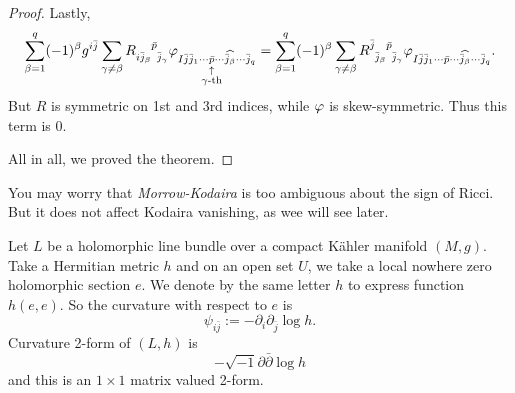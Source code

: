 \documentclass[12pt]{article}
\begin{document}
\begin{proof}
  Lastly, \[
    \sum_{\beta=1}^{q}(-1)^\beta g^{i\bar{j}}
    \sum_{\gamma\neq\beta}R\indices{_{i\bar{j}_\beta}^{\bar{p}}_{\bar{j}_\gamma}}
    \vphi_{I\bar{j}\bar{j}_1\cdots\underset{\mathclap{\substack{\uparrow\\\gamma
    \text{-th}}}}{\bar{p}}\cdots\widehat{\bar{j}_\beta}\cdots \bar{j}_q}
    =\sum_{\beta=1}^{q}(-1)^\beta \sum_{\gamma\neq \beta}R\indices{^{\bar{j}}
    _{\bar{j}_\beta}^{\bar{p}}_{\bar{j}_\gamma}}\vphi_{I\bar{j}\bar{j}_1\cdots
    \bar{p}\cdots\widehat{\bar{j}_\beta}\cdots \bar{j}_q}
  .\] But \(R\) is symmetric on 1st and 3rd indices, while \(\varphi\) is
  skew-symmetric. Thus this term is 0.

  All in all, we proved the theorem.
\end{proof}

\begin{remark}
  You may worry that \emph{Morrow-Kodaira} is too ambiguous about the sign
  of Ricci. But it does not affect Kodaira vanishing, as wee will see later.
\end{remark}

Let \(L\) be a holomorphic line bundle over a compact Kähler manifold \((M,g)\).
Take a Hermitian metric \(h\) and on an open set \(U\), we take a local
nowhere zero holomorphic section \(e\). We denote by the same letter \(h\) to
express function \(h(e,e)\). So the curvature with respect to \(e\) is \[
  \psi_{i\bar{j}}:=-\partial_i\partial_{\bar{j}}\log h
.\] Curvature 2-form of \((L,h)\) is \[
  -\sqrt{-1}\partial\bar{\partial}\log h
\] and this is an \(1\times 1\) matrix valued 2-form.
\end{document}
